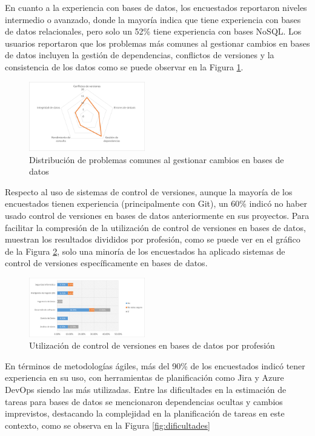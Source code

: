 \documentclass{IEEEtran}
\begin{document}
En cuanto a la experiencia con bases de datos, los encuestados reportaron niveles intermedio o avanzado, donde la mayoría indica que tiene experiencia con bases de datos relacionales, pero solo un 52\% tiene experiencia con bases NoSQL. Los usuarios reportaron que los problemas más comunes al gestionar cambios en bases de datos incluyen la gestión de dependencias, conflictos de versiones y la consistencia de los datos como se puede observar en la Figura \ref{fig:commonDBIssues}.

\begin{figure}[H]
    \centering
    \includegraphics[width=0.45\textwidth]{images/commonDBIssues.png}
    \caption{Distribución de problemas comunes al gestionar cambios en bases de datos}
    \label{fig:commonDBIssues}
\end{figure}

Respecto al uso de sistemas de control de versiones, aunque la mayoría de los encuestados tienen experiencia (principalmente con Git), un 60\% indicó no haber usado control de versiones en bases de datos anteriormente en sus proyectos. Para facilitar la compresión de la utilización de control de versiones en bases de datos, muestran los resultados divididos por profesión, como se puede ver en el gráfico de la Figura \ref{fig:vcsDBbyProfesion}, solo una minoría de los encuestados ha aplicado sistemas de control de versiones específicamente en bases de datos.

\begin{figure}[H]
    \centering
    \includegraphics[width=0.45\textwidth]{images/vcsDBbyProfesion.png}
    \caption{Utilización de control de versiones en bases de datos por profesión}
    \label{fig:vcsDBbyProfesion}
\end{figure}

En términos de metodologías ágiles, más del 90\% de los encuestados indicó tener experiencia en su uso, con herramientas de planificación como Jira y Azure DevOps siendo las más utilizadas. Entre las dificultades en la estimación de tareas para bases de datos se mencionaron dependencias ocultas y cambios imprevistos, destacando la complejidad en la planificación de tareas en este contexto, como se observa en la Figura \ref{fig:dificultades}
\end{document}
